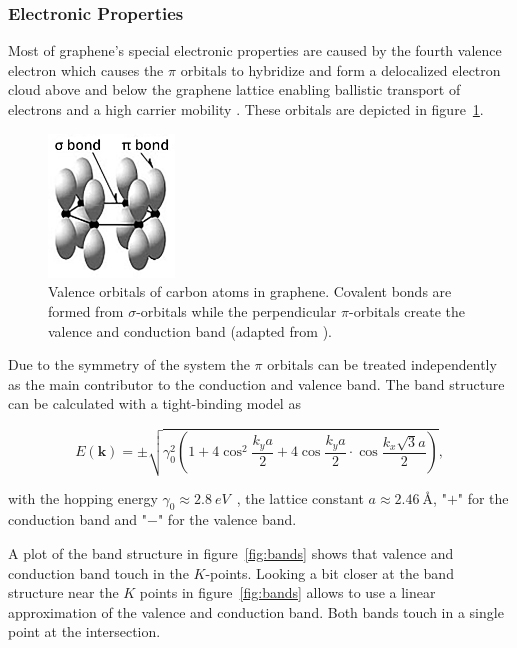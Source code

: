 \newpage

\subsubsection{Electronic Properties}

Most of graphene's special electronic properties are caused by the fourth valence electron which causes the $\pi$ orbitals to hybridize and form a delocalized electron cloud above and below the graphene lattice enabling ballistic transport of electrons and a high carrier mobility \cite{carrier}. These orbitals are depicted in figure~\ref{fig:orbitals}.

\begin{figure}[!h]
  \centering
  \includegraphics[width=0.3\textwidth]{./images/orbitals.png}
  \caption{Valence orbitals of carbon atoms in graphene. Covalent bonds are formed from $\sigma$-orbitals while the perpendicular $\pi$-orbitals create the valence and conduction band (adapted from \cite{orbitals}).}
  \label{fig:orbitals}
\end{figure}

Due to the symmetry of the system the $\pi$ orbitals can be treated independently as the main contributor to the conduction and valence band. The band structure can be calculated with a tight-binding model as \cite{dispersion}

\begin{equation}
  E(\mathbf{k})=\pm\sqrt{\gamma_0^2\left(1+4\cos^2\frac{k_ya}{2}+4\cos\frac{k_ya}{2}\cdot\cos\frac{k_x\sqrt{3}a}{2}\right)},
  \label{eq:dispersion}
\end{equation}

with the hopping energy $\gamma_0\approx\SI{2.8}{eV}$~\cite{dispersion}, the lattice constant $a\approx\SI{2.46}{Å}$, "$+$" for the conduction band and "$-$" for the valence band.

A plot of the band structure in figure~\ref{fig:bands} shows that valence and conduction band touch in the $K$-points. Looking a bit closer at the band structure near the $K$ points in figure~\ref{fig:bands} allows to use a linear approximation of the valence and conduction band. Both bands touch in a single point at the intersection.


